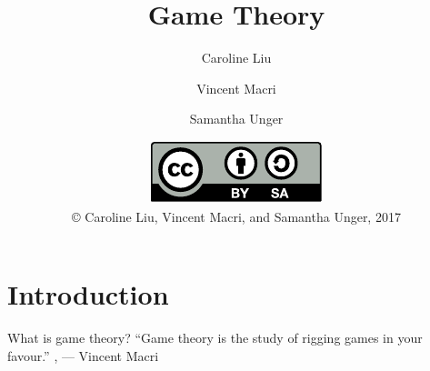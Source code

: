 

\usepackage{skull}
\usepackage{tikz}
\usepackage{forest}

\title{Game Theory}
\author{Caroline Liu \and Vincent Macri \and Samantha Unger}
\date{\includegraphics{../LicenseLogo}\\\copyright{} Caroline Liu, Vincent Macri, and Samantha Unger, 2017}

\newcommand{\emoji}[1]{\raisebox{-0.25\baselineskip}{\texttt{[image: \#1]}}}



	\frame{\titlepage}
	\section{Introduction}
	\begin{namedframe}{What is game theory?}
		``Game theory is the study of rigging games in your favour.''
		\sep
		\flushright
		--- Vincent Macri
	\end{namedframe}
	
	
	


